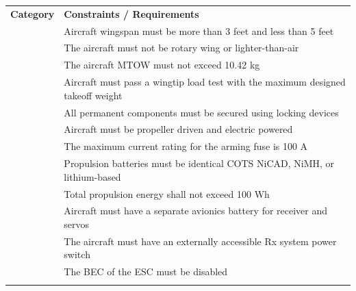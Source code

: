 \documentclass[10pt, letterpaper]{article}
\renewcommand{\arraystretch}{1.15} %
\begin{document}
\begin{table}[H]
\centering
\small %
\renewcommand{\arraystretch}{0.9} %
\setlength{\tabcolsep}{4pt} %

\begin{tabularx}{\textwidth}
{|>{\centering\arraybackslash\bfseries\columncolor{db}}m{2.5cm}|
 >{\arraybackslash}X|}
\hline
\rowcolor{y}Category & \textbf{Constraints / Requirements} \\ \Xhline{1.5pt} %

& Aircraft wingspan must be more than 3 feet and less than 5 feet \\ \arrayrulecolor{db}\cline{2-2}
& The aircraft must not be rotary wing or lighter-than-air \\ \arrayrulecolor{db}\cline{2-2}\multirow{-3}{*}{\textcolor{gray!5}{Configuration}}
& The aircraft MTOW must not exceed 10.42 kg \\ \arrayrulecolor{black}\Xhline{1.5pt} %

& Aircraft must pass a wingtip load test with the maximum designed takeoff weight \\ \arrayrulecolor{db}\cline{2-2}\multirow{-2}{*}{\textcolor{gray!5}{Structure}}
& All permanent components must be secured using locking devices \\ \arrayrulecolor{black}\Xhline{1.5pt} %

& Aircraft must be propeller driven and electric powered \\ \arrayrulecolor{db}\cline{2-2}
& The maximum current rating for the arming fuse is 100 A \\ \arrayrulecolor{db}\cline{2-2}
& Propulsion batteries must be identical COTS NiCAD, NiMH, or lithium-based \\ \arrayrulecolor{db}\cline{2-2}
& Total propulsion energy shall not exceed 100 Wh \\ \arrayrulecolor{db}\cline{2-2}
& Aircraft must have a separate avionics battery for receiver and servos \\ \arrayrulecolor{db}\cline{2-2}
& The aircraft must have an externally accessible Rx system power switch \\ \arrayrulecolor{db}\cline{2-2}\multirow{-7}{*}{\textcolor{gray!5}{Propulsion}}
& The BEC of the ESC must be disabled \\ \arrayrulecolor{black}\Xhline{1.5pt} %


\end{tabularx}
\end{table}
\end{document}
